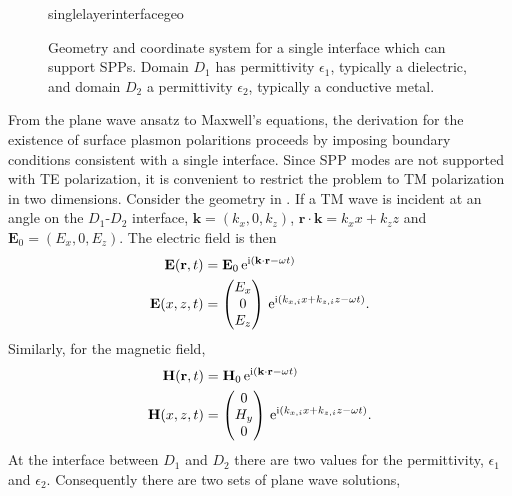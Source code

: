 \begin{figure}[ht]
 \centering
 {singlelayerinterfacegeo}
	\caption{Geometry and coordinate system for a single interface which can
support SPPs.  Domain $D_1$ has permittivity $\epsilon_1$, typically a
dielectric, and domain $D_2$ a permittivity $\epsilon_2$, typically a
conductive metal.}
 \label{fig:singleinterfacegeo}
\end{figure}

From the plane wave ansatz to Maxwell's equations, the 
derivation for the existence of surface plasmon polaritions proceeds 
by imposing boundary conditions consistent with a single
interface.  Since SPP modes are not supported with TE polarization, it is
convenient to restrict the problem to TM polarization in two dimensions.
Consider the geometry in .  If
a TM wave is incident at an angle on the $D_1$-$D_2$ interface,
$\mathbf{k}=(k_x,0,k_z)$,
$\mathbf{r}\cdot\mathbf{k}=k_x x + k_z z$ and $\mathbf{E}_0 = (E_x, 0,
E_z)$. The electric field is then
\begin{align}
\mathbf{E} ( \mathbf{r}, t ) &= \mathbf{E}_0\, {\mathrm{e}}^{{\mathrm{i}} (\mathbf{k}
\cdot \mathbf{r} - \omega t )}\\
\mathbf{E}(x,z,t)&=\begin{pmatrix}
E_x\\ 0\\ E_z
\end{pmatrix}
\, {\mathrm{e}}^{{\mathrm{i}}(k_{x,i}x+k_{z,i}z-\omega t)}.
\label{eqn:planewavexz}
\end{align}
Similarly, for the magnetic field,
\begin{align}
\mathbf{H} ( \mathbf{r}, t ) &= \mathbf{H}_0\, {\mathrm{e}}^{{\mathrm{i}} (\mathbf{k}
\cdot \mathbf{r} - \omega t )}\\
\mathbf{H}(x,z,t)&=\begin{pmatrix}
0\\ H_y\\ 0
\end{pmatrix}
\, {\mathrm{e}}^{{\mathrm{i}}(k_{x,i}x+k_{z,i}z-\omega t)}.
\end{align}
At the interface between $D_1$ and $D_2$ there are two values for the permittivity,
$\epsilon_1$ and $\epsilon_2$.  Consequently there are two sets of plane
wave solutions,
